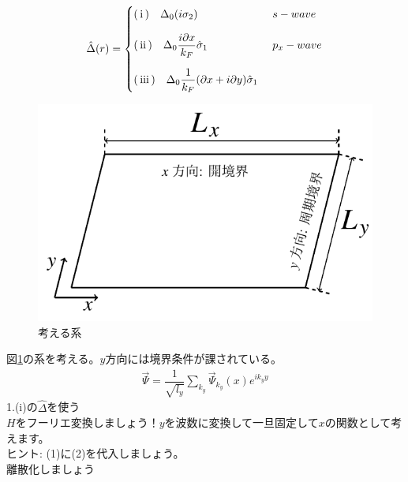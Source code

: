 \documentclass{jarticle}
\begin{document}
\begin{align}
\hat{\Delta}(r)=
\begin{cases}
$\rm(\hspace{.18em}i\hspace{.18em})\quad$\Delta_0(i\sigma_2)
& s-wave
\vspace*{1em}\\
$\rm(\hspace{.18em}ii\hspace{.18em})$\quad\Delta_0\dfrac{i\partial x}{k_F}\hat\sigma_1
&p_x-wave
\vspace*{1em}\\
$\rm(\hspace{.18em}iii\hspace{.18em})$\quad\Delta_0\dfrac{1}{k_F}(\partial x+i\partial y)\hat\sigma_1\
\end{cases}
\label{delta}
\end{align}
\begin{figure}[H]
	\centering
	\includegraphics[scale=1]{./figure_fix.pdf}
	\caption{考える系}
	\label{system}
\end{figure}
図\ref{system}の系を考える。$y$方向には境界条件が課されている。
\begin{align}
 \vec{\Psi}=\dfrac{1}{\sqrt{l_y}}\displaystyle\sum_{k_y}\vec{\Psi}_{k_y}(x)e^{ik_yy}
\end{align}
1.(i)の$\hat{\Delta}$を使う\\
$H$をフーリエ変換しましょう！$y$を波数に変換して一旦固定して$x$の関数として考えます。
\\ ヒント: (1)に(2)を代入しましょう。\\
離散化しましょう\\
\end{document}
